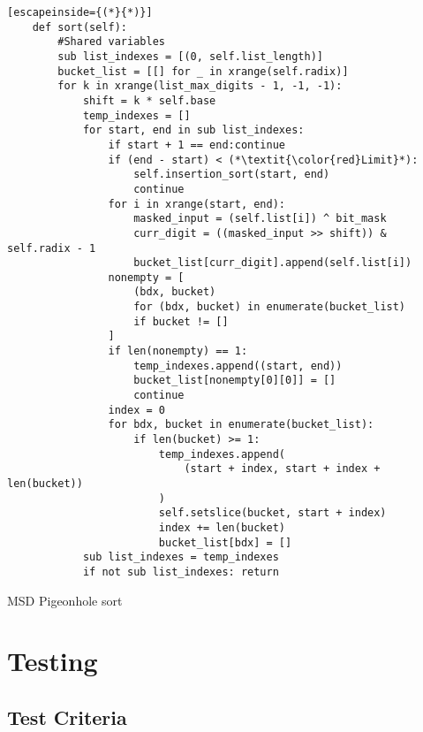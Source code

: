 \documentclass[12pt]{article}
\begin{document}
\begin{table}[H]
	\lstset{
		language=python,
    numbers=left,
    stepnumber=1,
    showstringspaces=false,
    tabsize=3,
    breaklines=true,
    breakatwhitespace=false,}
	\centering
	\begin{lstlisting}[escapeinside={(*}{*)}]
	def sort(self):
		#Shared variables
		sub list_indexes = [(0, self.list_length)]
		bucket_list = [[] for _ in xrange(self.radix)]
		for k in xrange(list_max_digits - 1, -1, -1):
			shift = k * self.base
			temp_indexes = []
			for start, end in sub list_indexes:
				if start + 1 == end:continue
				if (end - start) < (*\textit{\color{red}Limit}*):
					self.insertion_sort(start, end)
					continue
				for i in xrange(start, end):
					masked_input = (self.list[i]) ^ bit_mask
					curr_digit = ((masked_input >> shift)) & self.radix - 1
					bucket_list[curr_digit].append(self.list[i])
				nonempty = [
					(bdx, bucket)
					for (bdx, bucket) in enumerate(bucket_list)
					if bucket != []
				]
				if len(nonempty) == 1:
					temp_indexes.append((start, end))
					bucket_list[nonempty[0][0]] = []
					continue
				index = 0
				for bdx, bucket in enumerate(bucket_list):
					if len(bucket) >= 1:
						temp_indexes.append(
							(start + index, start + index + len(bucket))
						)
						self.setslice(bucket, start + index)
						index += len(bucket)
						bucket_list[bdx] = []
			sub list_indexes = temp_indexes
			if not sub list_indexes: return
\end{lstlisting}
\caption*{MSD Pigeonhole sort}
\end{table}
\pagebreak
\section{Testing}
\subsection{Test Criteria}
\end{document}
